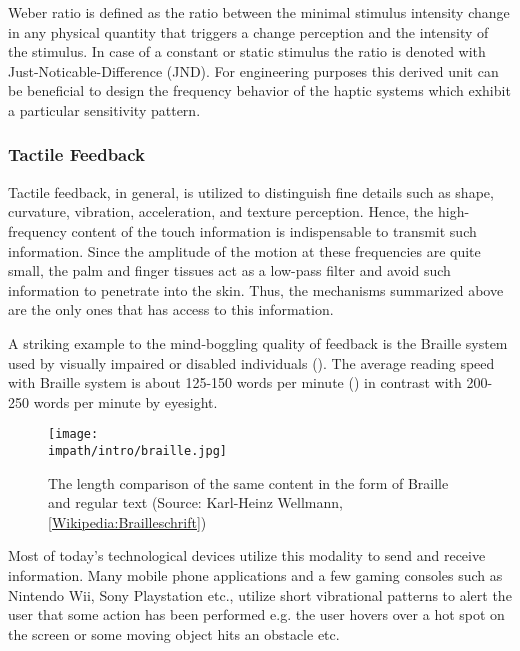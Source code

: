 Weber ratio is defined as the ratio between the minimal stimulus intensity change in any physical quantity that triggers a change perception and the intensity of the stimulus. In case of a constant or static stimulus the ratio is denoted with Just-Noticable-Difference (JND). For engineering purposes this derived unit can be beneficial to design the frequency behavior of the haptic systems which exhibit a particular sensitivity pattern.


\subsubsection{Tactile Feedback}

Tactile feedback, in general, is utilized to distinguish fine details such as shape, curvature, vibration, acceleration, and texture perception. Hence, the high-frequency content of the touch information is indispensable to transmit such information. Since the amplitude of the motion at these frequencies are quite small, the palm and finger tissues act as a low-pass filter and avoid such information to penetrate into the skin. Thus, the mechanisms summarized above are the only ones that has access to this information.

A striking example to the mind-boggling quality of feedback is the Braille system used by visually impaired or disabled individuals (). The average reading speed with Braille system is about 125-150 words per minute (\cite{americanblind}) in contrast with 200-250 words per minute by eyesight. 

\begin{figure}%
\centering
\texttt{[image: \\impath/intro/braille.jpg]}%
\caption[The length comparison of the same content in the form of Braille and 
regular text]{The length comparison of the same content in the form of Braille and 
regular text (Source: Karl-Heinz Wellmann, 
\href{http://de.wikipedia.org/wiki/Brailleschrift}{[Wikipedia:Brailleschrift]})}%
\label{fig:braille}%
\end{figure}

Most of today's technological devices utilize this modality to send and receive information. Many mobile phone applications and a few gaming consoles such as Nintendo Wii\raisebox{0.5ex}{\scriptsize\texttrademark}, Sony Playstation\raisebox{0.5ex}{\scriptsize\texttrademark} etc., utilize short vibrational patterns to alert the user that some action has been performed e.g. the user hovers over a hot spot on the screen or some moving object hits an obstacle etc. 

